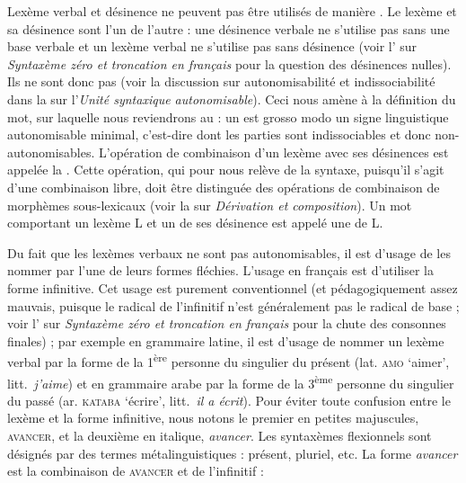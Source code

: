 Lexème verbal et désinence ne peuvent pas être utilisés de manière . Le lexème et sa désinence sont  l’un de l’autre : une désinence verbale ne s’utilise pas sans une base verbale et un lexème verbal ne s’utilise pas sans désinence (voir l’ sur \textit{Syntaxème zéro et troncation en français} pour la question des désinences nulles). Ils ne sont donc pas  (voir la discussion sur autonomisabilité et indissociabilité dans la  sur l'\textit{Unité syntaxique autonomisable}). Ceci nous amène à la définition du mot, sur laquelle nous reviendrons au  : un  est grosso modo un signe linguistique autonomisable minimal, c’est-dire dont les parties sont indissociables et donc non-autonomisables. L'opération de combinaison d'un lexème avec ses désinences est appelée la . Cette opération, qui pour nous relève de la syntaxe, puisqu'il s'agit d'une combinaison libre, doit être distinguée des opérations de combinaison de morphèmes sous-lexicaux (voir la  sur \textit{Dérivation et composition}). Un mot comportant un lexème L et un de ses désinence est appelé une  de L.

Du fait que les lexèmes verbaux ne sont pas autonomisables, il est d’usage de les nommer par l’une de leurs formes fléchies. L’usage en français est d’utiliser la forme infinitive. Cet usage est purement conventionnel (et pédagogiquement assez mauvais, puisque le radical de l’infinitif n’est généralement pas le radical de base ; voir l’ sur \textit{Syntaxème zéro et troncation en français} pour la chute des consonnes finales) ; par exemple en grammaire latine, il est d’usage de nommer un lexème verbal par la forme de la 1\textsuperscript{ère} personne du singulier du présent (lat. \textsc{amo} ‘aimer’, litt.\ \textit{j'aime}) et en grammaire arabe par la forme de la 3\textsuperscript{ème} personne du singulier du passé (ar. \textsc{kataba} ‘écrire’, litt.\ \textit{il a écrit}). Pour éviter toute confusion entre le lexème et la forme infinitive, nous notons le premier en petites majuscules, \textsc{avancer}, et la deuxième en italique, \textit{avancer}. Les syntaxèmes flexionnels sont désignés par des termes métalinguistiques : présent, pluriel, etc. La forme \textit{avancer} est la combinaison de \textsc{avancer} et de l’infinitif :

